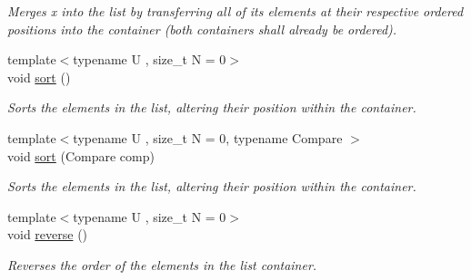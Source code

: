 \begin{DoxyCompactItemize}
\begin{DoxyCompactList}\small\item\em Merges x into the list by transferring all of its elements at their respective ordered positions into the container (both containers shall already be ordered). \end{DoxyCompactList}\item 
\hypertarget{classheterogeneous_1_1heteroforward__list_3_01_t_00_01_types_8_8_8_4_ac57b5d84a5a9310f168b4309f66edce9}{}{\footnotesize template$<$typename U , size\+\_\+t N = 0$>$ }\\void \hyperlink{classheterogeneous_1_1heteroforward__list_3_01_t_00_01_types_8_8_8_4_ac57b5d84a5a9310f168b4309f66edce9}{sort} ()\label{classheterogeneous_1_1heteroforward__list_3_01_t_00_01_types_8_8_8_4_ac57b5d84a5a9310f168b4309f66edce9}

\begin{DoxyCompactList}\small\item\em Sorts the elements in the list, altering their position within the container. \end{DoxyCompactList}\item 
\hypertarget{classheterogeneous_1_1heteroforward__list_3_01_t_00_01_types_8_8_8_4_a41abf2cba8d969050b2b5a6e49e6a394}{}{\footnotesize template$<$typename U , size\+\_\+t N = 0, typename Compare $>$ }\\void \hyperlink{classheterogeneous_1_1heteroforward__list_3_01_t_00_01_types_8_8_8_4_a41abf2cba8d969050b2b5a6e49e6a394}{sort} (Compare comp)\label{classheterogeneous_1_1heteroforward__list_3_01_t_00_01_types_8_8_8_4_a41abf2cba8d969050b2b5a6e49e6a394}

\begin{DoxyCompactList}\small\item\em Sorts the elements in the list, altering their position within the container. \end{DoxyCompactList}\item 
\hypertarget{classheterogeneous_1_1heteroforward__list_3_01_t_00_01_types_8_8_8_4_a5bf657ae149fc00f8244a9154998c05f}{}{\footnotesize template$<$typename U , size\+\_\+t N = 0$>$ }\\void \hyperlink{classheterogeneous_1_1heteroforward__list_3_01_t_00_01_types_8_8_8_4_a5bf657ae149fc00f8244a9154998c05f}{reverse} ()\label{classheterogeneous_1_1heteroforward__list_3_01_t_00_01_types_8_8_8_4_a5bf657ae149fc00f8244a9154998c05f}

\begin{DoxyCompactList}\small\item\em Reverses the order of the elements in the list container. \end{DoxyCompactList}\end{DoxyCompactItemize}
